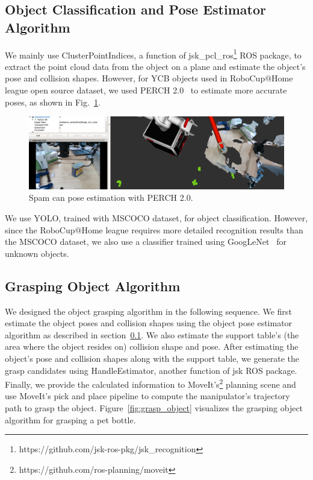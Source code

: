\documentclass[runningheads,a4paper]{llncs}
\begin{document}
\subsection{Object Classification and Pose Estimator Algorithm}
\label{sec:pose_estimation}
We mainly use ClusterPointIndices, a function of jsk\_pcl\_ros\footnote{https://github.com/jsk-ros-pkg/jsk\_recognition} ROS package, to extract the point cloud data from the object on a plane and estimate the object's pose and collision shapes.
However, for YCB objects used in RoboCup@Home league open source dataset, we used PERCH 2.0~\cite{Agarwal2020PERCH2} to estimate more accurate poses, as shown in Fig.~\ref{fig:perch}.
\begin{figure}[tbp]
    \centering
    \includegraphics[width=0.6\linewidth]{images/pearch.png}
    \caption{Spam can pose estimation with PERCH 2.0.}
    \label{fig:perch}
\end{figure}

We use YOLO, trained with MSCOCO dataset, for object classification.
However, since the RoboCup@Home league requires more detailed recognition results than the MSCOCO dataset, we also use a classifier trained using GoogLeNet~\cite{Massouh2019} for unknown objects.

\subsection{Grasping Object Algorithm}
\label{sec:grasp_object}
We designed the object grasping algorithm in the following sequence. We first estimate the object poses and collision shapes using the object pose estimator algorithm as described in section~\ref{sec:pose_estimation}. We also estimate the support table’s (the area where the object resides on) collision shape and pose. After estimating the object’s pose and collision shapes along with the support table, we generate the grasp candidates using HandleEstimator, another function of jsk ROS package. Finally, we provide the calculated information to MoveIt’s\footnote{https://github.com/ros-planning/moveit} planning scene and use MoveIt’s pick and place pipeline to compute the manipulator’s trajectory path to grasp the object. Figure~\ref{fig:grasp_object} visualizes the grasping object algorithm for grasping a pet bottle.
\end{document}
